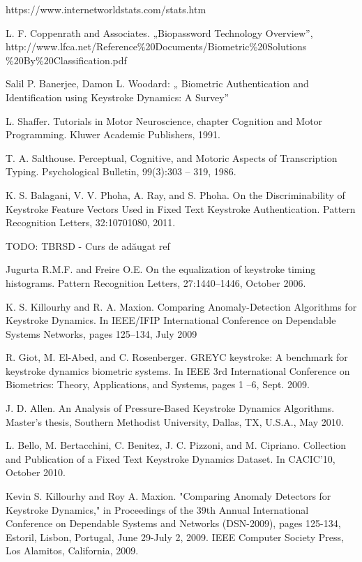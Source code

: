 \documentclass[9pt,shortpaper,twoside,web]{ieeecolor}
\begin{document}
\begin{thebibliography}{00}

 https://www.internetworldstats.com/stats.htm

 L. F. Coppenrath and Associates. „Biopassword Technology Overview”, http://www.lfca.net/Reference\%20Documents/Biometric\%20Solutions \%20By\%20Classification.pdf

 Salil P. Banerjee, Damon L. Woodard: „ Biometric Authentication and Identification using Keystroke Dynamics: A Survey”

 L. Shaffer. Tutorials in Motor Neuroscience, chapter Cognition and Motor Programming. Kluwer Academic Publishers, 1991.

 T. A. Salthouse. Perceptual, Cognitive, and Motoric Aspects of Transcription Typing. Psychological Bulletin, 99(3):303 – 319, 1986.

 K. S. Balagani, V. V. Phoha, A. Ray, and S. Phoha. On the Discriminability of Keystroke Feature Vectors Used in Fixed Text Keystroke Authentication. Pattern Recognition Letters, 32:10701080, 2011.

 TODO: TBRSD - Curs de adăugat ref

 Jugurta R.M.F. and Freire O.E. On the equalization of keystroke timing histograms. Pattern Recognition Letters, 27:1440–1446, October 2006.

 K. S. Killourhy and R. A. Maxion. Comparing Anomaly-Detection Algorithms for Keystroke Dynamics. In IEEE/IFIP International Conference on Dependable Systems Networks, pages 125–134, July 2009

 R. Giot, M. El-Abed, and C. Rosenberger. GREYC keystroke: A benchmark for keystroke dynamics biometric systems. In IEEE 3rd International Conference on Biometrics: Theory, Applications, and Systems, pages 1 –6, Sept. 2009.

 J. D. Allen. An Analysis of Pressure-Based Keystroke Dynamics Algorithms. Master’s thesis,
Southern Methodist University, Dallas, TX, U.S.A., May 2010.

 L. Bello, M. Bertacchini, C. Benitez, J. C. Pizzoni, and M. Cipriano. Collection and Publication of a Fixed Text Keystroke Dynamics Dataset. In CACIC’10, October 2010.

 Kevin S. Killourhy and Roy A. Maxion. "Comparing Anomaly Detectors for Keystroke Dynamics," in Proceedings of the 39th Annual International Conference on Dependable Systems and Networks (DSN-2009), pages 125-134, Estoril, Lisbon, Portugal, June 29-July 2, 2009. IEEE Computer Society Press, Los Alamitos, California, 2009.


\end{thebibliography}
\end{document}
